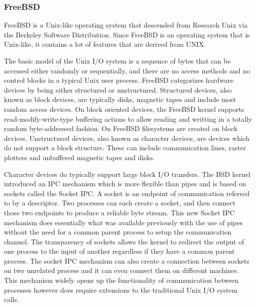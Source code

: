 \documentclass[10pt,draftclsnofoot,onecolumn,journal,compsoc]{IEEEtran}
\begin{document}
\subsubsection*{FreeBSD}
FreeBSD is a Unix-like operating system that descended from Research Unix via the Berkeley Software Distribution. Since FreeBSD is an operating system that is Unix-like, it contains a lot of features that are derived from UNIX. \par
The basic model of the Unix I/O system is a sequence of bytes that can be accessed either randomly or sequentially, and there are no access methods and no control blocks in a typical Unix user process. FreeBSD categorizes hardware devices by being either structured or unstructured. Structured devices, also known as block devices, are typically disks, magnetic tapes and include most random access devices. On block oriented devices, the FreeBSD kernel supports read-modify-write-type buffering actions to allow reading and writting in a totally random byte-addressed fashion. On FreeBSD filesystems are created on block devices. Unstructured devices, also known as character devices, are devices which do not support a block structure. These can include communication lines, raster plotters and unbuffered magnetic tapes and disks.\par
Character devices do typically support large block I/O transfers. The BSD kernel introduced an IPC mechanism which is more flexible than pipes and is based on sockets called the Socket IPC. A socket is an endpoint of communication referred to by a descriptor. Two processes can each create a socket, and then connect those two endpoints to produce a reliable byte stream. This new Socket IPC mechanism does essentially what was available previously with the use of pipes without the need for a common parent process to setup the communication channel. The transparency of sockets allows the kernel to redirect the output of one process to the input of another regardless if they have a common parent process. The socket IPC mechanism can also create a connection between sockets on two unrelated process and it can even connect them on different machines. This mechanism widely opens up the functionality of communication between processes however does require extensions to the traditional Unix I/O system calls. \par
\end{document}
